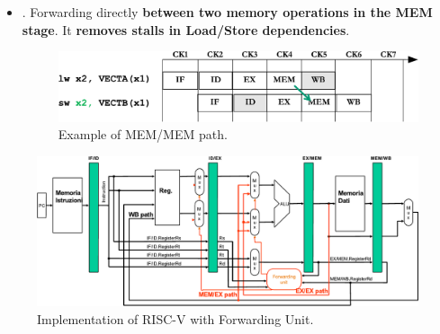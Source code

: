 \begin{enumerate}[label=\textcolor{Green3}{\faIcon{check}}]
\begin{itemize}
      \item {}. Forwarding directly \textbf{between two memory operations in the MEM stage}. It \textbf{removes stalls in Load/Store dependencies}.
      \begin{figure}[!htp]
         \centering
         \includegraphics[width=\textwidth]{img/mem-mem-path-1.pdf}
         \caption{Example of MEM/MEM path.}
      \end{figure}
   \end{itemize}

   \begin{figure}[!htp]
      \centering
      \includegraphics[width=\textwidth]{img/risc-v-forwarding-unit-1.pdf}
      \caption{Implementation of RISC-V with Forwarding Unit.}
   \end{figure}
\end{enumerate}
